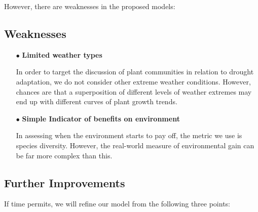 \documentclass[12pt]{article}  %
\begin{document}
However, there are weaknesses in the proposed models:

\vspace{-0.5cm}
\subsection{Weaknesses}
\vspace{-0.3cm}
\begin{itemize}

\item[$\bullet$] \textbf{Limited weather types}

In order to target the discussion of plant communities in relation to drought adaptation, we do not consider other extreme weather conditions. However, chances are that a superposition of different levels of weather extremes may end up with different curves of plant growth trends.

\item[$\bullet$] \textbf{Simple Indicator of benefits on environment}

In assessing when the environment starts to pay off, the metric we use is species diversity. However, the real-world measure of environmental gain can be far more complex than this.

\end{itemize}

\vspace{-0.5cm}
\subsection{Further Improvements}

\vspace{-0.3cm}
If time permits, we will refine our model from the following three points:
\end{document}
